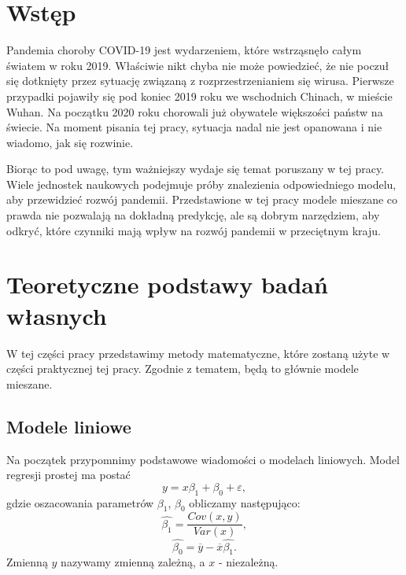\documentclass[12pt]{mwbk}
\theoremstyle{plain}
\theoremstyle{definition}
\theoremstyle{remark}
\begin{document}



\tableofcontents


\chapter*{Wstęp}




Pandemia choroby COVID-19 jest wydarzeniem, które wstrząsnęło całym światem w roku 2019. Właściwie nikt chyba nie może powiedzieć, że nie poczuł się dotknięty przez sytuację związaną z rozprzestrzenianiem się wirusa. Pierwsze przypadki pojawiły się pod koniec 2019 roku we wschodnich Chinach, w mieście Wuhan. Na początku 2020 roku chorowali już obywatele większości państw na świecie. Na moment pisania tej pracy, sytuacja nadal nie jest opanowana i nie wiadomo, jak się rozwinie.

Biorąc to pod uwagę, tym ważniejszy wydaje się temat poruszany w tej pracy. Wiele jednostek naukowych podejmuje próby znalezienia odpowiedniego modelu, aby przewidzieć rozwój pandemii. Przedstawione w tej pracy modele mieszane co prawda nie pozwalają na dokładną predykcję, ale są dobrym narzędziem, aby odkryć, które czynniki mają wpływ na rozwój pandemii w przeciętnym kraju.











\chapter{Teoretyczne podstawy badań własnych}
W tej części pracy przedstawimy metody matematyczne, które zostaną użyte w części praktycznej tej pracy. Zgodnie z tematem, będą to głównie modele mieszane.
\section{Modele liniowe}
Na początek przypomnimy podstawowe wiadomości o modelach liniowych. Model regresji prostej ma postać $$y=x \beta_1+\beta_0 + \varepsilon,$$ gdzie oszacowania parametrów $\beta_1$, $\beta_0$ obliczamy następująco:
$$\hat{\beta_1}=\frac{Cov(x,y)}{Var(x)},$$
$$\hat{\beta_0}=\overline{y}-\overline{x}\hat{\beta_1}.$$ Zmienną $y$ nazywamy zmienną zależną, a $x$ - niezależną.
\end{document}

